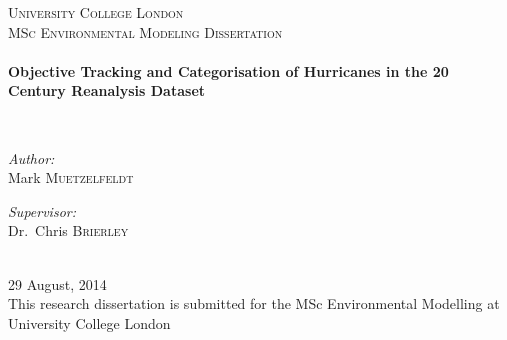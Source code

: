 \begin{titlepage}

\begin{center}

\textsc{\LARGE University College London}\\[1.5cm]

\textsc{\Large MSc Environmental Modeling Dissertation}\\[0.5cm]

\HRule \\[0.4cm]
{ \LARGE \bfseries Objective Tracking and Categorisation of Hurricanes in the 20 Century Reanalysis Dataset \\[0.4cm] }

\HRule \\[1.5cm]

\begin{minipage}{0.4\textwidth}
\begin{flushleft} \large
\emph{Author:}\\
Mark \textsc{Muetzelfeldt}
\end{flushleft}
\end{minipage}
\begin{minipage}{0.4\textwidth}
\begin{flushright} \large
\emph{Supervisor:} \\
Dr.~Chris \textsc{Brierley}
\end{flushright}
\end{minipage}
\\[0.5cm]
29 August, 2014
\\[0.5cm]

This research dissertation is submitted for the MSc Environmental Modelling at University College London


\vfill

\end{center}

\end{titlepage}

